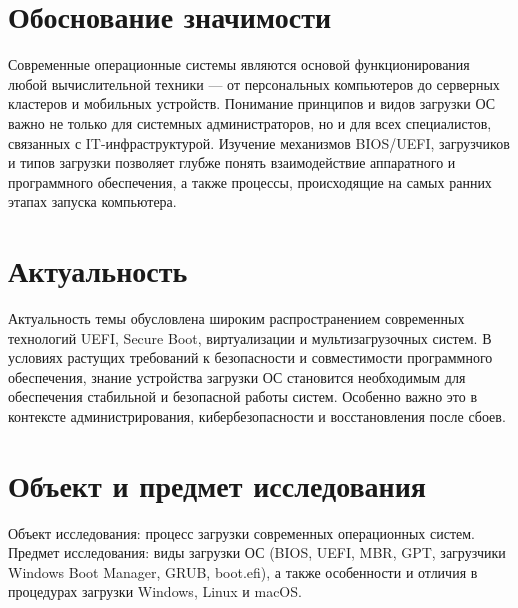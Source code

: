 \hypertarget{ux43eux431ux43eux441ux43dux43eux432ux430ux43dux438ux435-ux437ux43dux430ux447ux438ux43cux43eux441ux442ux438}{%
\chapter{Обоснование
значимости}\label{ux43eux431ux43eux441ux43dux43eux432ux430ux43dux438ux435-ux437ux43dux430ux447ux438ux43cux43eux441ux442ux438}}

Современные операционные системы являются основой функционирования любой
вычислительной техники --- от персональных компьютеров до серверных
кластеров и мобильных устройств. Понимание принципов и видов загрузки ОС
важно не только для системных администраторов, но и для всех
специалистов, связанных с IT-инфраструктурой. Изучение механизмов
BIOS/UEFI, загрузчиков и типов загрузки позволяет глубже понять
взаимодействие аппаратного и программного обеспечения, а также процессы,
происходящие на самых ранних этапах запуска компьютера.

\hypertarget{ux430ux43aux442ux443ux430ux43bux44cux43dux43eux441ux442ux44c}{%
\chapter{Актуальность}\label{ux430ux43aux442ux443ux430ux43bux44cux43dux43eux441ux442ux44c}}

Актуальность темы обусловлена широким распространением современных
технологий UEFI, Secure Boot, виртуализации и мультизагрузочных систем.
В условиях растущих требований к безопасности и совместимости
программного обеспечения, знание устройства загрузки ОС становится
необходимым для обеспечения стабильной и безопасной работы систем.
Особенно важно это в контексте администрирования, кибербезопасности и
восстановления после сбоев.

\hypertarget{ux43eux431ux44aux435ux43aux442-ux438-ux43fux440ux435ux434ux43cux435ux442-ux438ux441ux441ux43bux435ux434ux43eux432ux430ux43dux438ux44f}{%
\chapter{Объект и предмет
исследования}\label{ux43eux431ux44aux435ux43aux442-ux438-ux43fux440ux435ux434ux43cux435ux442-ux438ux441ux441ux43bux435ux434ux43eux432ux430ux43dux438ux44f}}

Объект исследования: процесс загрузки современных операционных систем.
Предмет исследования: виды загрузки ОС (BIOS, UEFI, MBR, GPT, загрузчики
Windows Boot Manager, GRUB, boot.efi), а также особенности и отличия в
процедурах загрузки Windows, Linux и macOS.

